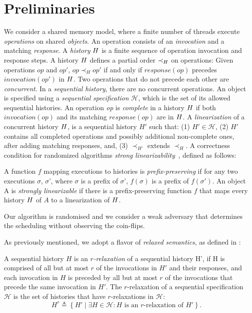 \chapter{Preliminaries}
\label{chap:prelims}

We consider a shared memory model, where a finite number of threads execute \emph{operations} on shared \emph{objects}. An operation consists of an \emph{invocation} and a matching \emph{response}. A \emph{history} \(\mathnormal{H}\) is a finite sequence of operation invocation and response steps. A history \(\mathnormal{H}\) defines a partial order \(\prec_\mathnormal{H}\) on operations: Given operations \(op\) and \(op'\), \(op \prec_H op'\) if and only if \(response(op)\) precedes \(invocation(op')\) in \(\mathnormal{H}\). Two operations that do not precede each other are \emph{concurrent}. In a \emph{sequential history}, there are no concurrent operations. An object is specified using a \emph{sequential specification} $\mathcal{H}$, which is the set of its allowed sequential histories.
An operation \emph{op} is \emph{complete} in a history \(\mathnormal{H}\) if both \(invocation(op)\) and its matching \(response(op)\) are in \(\mathnormal{H}\).
A \emph{linearization} of a concurrent history \(\mathnormal{H}\), is a sequential history $H'$ such that: (1) $H' \in \mathcal{H}$, (2) $H'$ contains all completed operations and possibly additional non-complete ones, after adding matching responses, and, (3) $\prec_{H'}$ extends $\prec_H$. A correctness condition for randomized algorithms \emph{strong linearizability}~\cite{strong_linearizability}, defined as follows: 

\begin{definition}
\label{def:strong_linearizability}
A function \(f\) mapping executions to histories is \emph{prefix-preserving} if for any two executions $\sigma$, $\sigma$', where $\sigma$ is a prefix of $\sigma$', $f(\sigma)$ is a prefix of $f(\sigma')$. 
An object A is \emph{strongly linearizable} if there is a prefix-preserving function \(f\) that maps every history \(\mathnormal{H}\) of $A$ to a linearization of \(\mathnormal{H}\).
\end{definition}

Our algorithm is randomised and we consider a weak adversary that determines the scheduling without observing the coin-flips.

As previously mentioned, we adopt a flavor of \emph{relaxed semantics}, as defined in \cite{Henzinger_2013_Quantitative_Relaxation}:

\begin{definition}[$r$-relaxation] \label{def:r-relaxtion}
A sequential history $H$ is an \emph{$r$-relaxation} of a sequential history H', if H is comprised of all but at most $r$ of the invocations in $H'$ and their responses,
and each invocation in $H$ is preceded by all but at most $r$ of the invocations that precede the same invocation in $H'$.
The $r$-relaxation of a sequential specification $\mathcal{H}$ is the set of histories that have $r$-relaxations in $\mathcal{H}$:
\[{H}^r \triangleq \left\{ H' \mid \exists H \in \mathcal{H}: H \text{ is an } r\text{-relaxation of } H'\right\}. \]
\end{definition}
